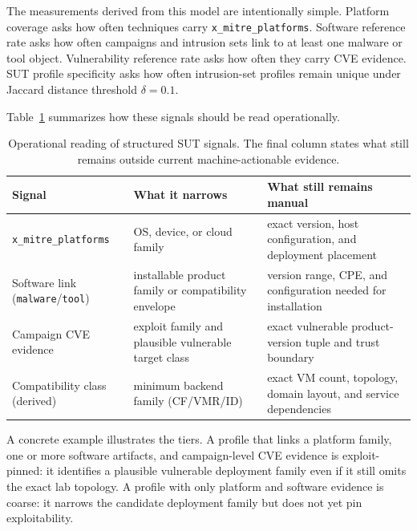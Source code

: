 \documentclass[sigconf]{acmart}
\begin{document}
The measurements derived from this model are intentionally simple. Platform coverage asks how often techniques carry \nolinkurl{x_mitre_platforms}. Software reference rate asks how often campaigns and intrusion sets link to at least one malware or tool object. Vulnerability reference rate asks how often they carry CVE evidence. SUT profile specificity asks how often intrusion-set profiles remain unique under Jaccard distance threshold $\delta = 0.1$.

Table~\ref{tab:signal_operational_reading} summarizes how these signals should be read operationally.

\begin{table}[!htb]
\caption{Operational reading of structured SUT signals. The final column states what still remains outside current machine-actionable evidence.}\label{tab:signal_operational_reading}
\centering\small
\begin{tabular}{@{}>{\raggedright\arraybackslash}p{2.0cm}>{\raggedright\arraybackslash}p{2.45cm}>{\raggedright\arraybackslash}p{2.35cm}@{}}
\toprule
\textbf{Signal} & \textbf{What it narrows} & \textbf{What still remains manual} \\
\midrule
\nolinkurl{x_mitre_platforms} & OS, device, or cloud family & exact version, host configuration, and deployment placement \\
Software link (\texttt{malware}/\texttt{tool}) & installable product family or compatibility envelope & version range, CPE, and configuration needed for installation \\
Campaign CVE evidence & exploit family and plausible vulnerable target class & exact vulnerable product-version tuple and trust boundary \\
Compatibility class (derived) & minimum backend family (CF/VMR/ID) & exact VM count, topology, domain layout, and service dependencies \\
\bottomrule
\end{tabular}
\end{table}

A concrete example illustrates the tiers. A profile that links a platform family, one or more software artifacts, and campaign-level CVE evidence is exploit-pinned: it identifies a plausible vulnerable deployment family even if it still omits the exact lab topology. A profile with only platform and software evidence is coarse: it narrows the candidate deployment family but does not yet pin exploitability.


\end{document}
